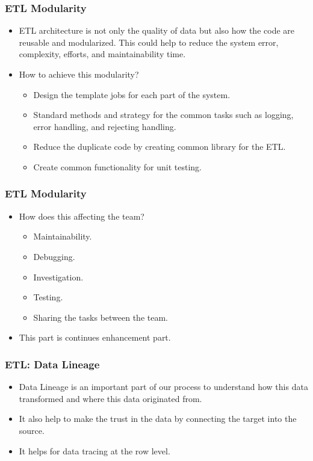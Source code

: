 \begin{frame}
	\frametitle{ETL Modularity}
	\begin{itemize}[<+->]
		\item ETL architecture is not only the quality of data but also how the code are reusable and modularized. This could help to reduce the system error, complexity, efforts, and maintainability time.
		\item How to achieve this modularity?
		\begin{itemize}[<+->]
			\item Design the template jobs for each part of the system.
			\item Standard methods and strategy for the common tasks such as logging, error handling, and rejecting handling.
			\item  Reduce the duplicate code by creating common library for the ETL.
			\item  Create common functionality for unit testing.

		\end{itemize}
	\end{itemize}
\end{frame}

\begin{frame}
	\frametitle{ETL Modularity}
	\begin{itemize}[<+->]
		\item How does this affecting the team?
		\begin{itemize}[<+->]
			\item Maintainability.
			\item Debugging.
			\item Investigation.
			\item Testing.
			\item Sharing the tasks between the team.

		\end{itemize}
		\item This part is continues enhancement part.
	\end{itemize}
\end{frame}
\begin{frame}
	\frametitle{ETL: Data Lineage}
	\begin{itemize}[<+->]
		\item Data Lineage is an important part of our process to understand how this data transformed and where this data originated from.
		\item It also help to make the trust in the data by connecting the target into the source.
		\item It helps for data tracing at the row level.
	\end{itemize}
\end{frame}

